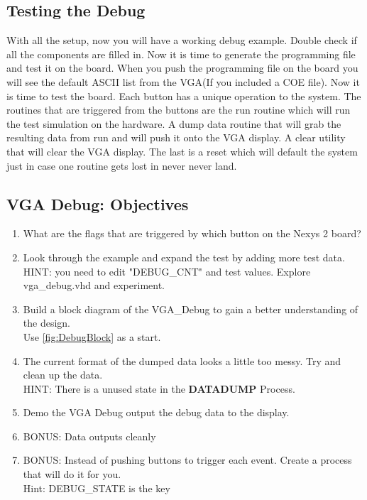 \documentclass{article}
\begin{document}
\newpage

\subsection{Testing the Debug}
With all the setup, now you will have a working debug example. Double check if all the components are filled in. Now it is time to generate the programming file and test it on the board. When you push the programming file on the board you will see the default ASCII list from the VGA(If you included a COE file). Now it is time to test the board. Each button has a unique operation to the system. The routines that are triggered from the buttons are the run routine which will run the test simulation on the hardware. A dump data routine that will grab the resulting data from run and will push it onto the VGA display. A clear utility that will clear the VGA display. The last is a reset which will default the system just in case one routine gets lost in never never land.

\subsection{VGA Debug: Objectives}
\begin{enumerate}
  \item What are the flags that are triggered by which button on the Nexys 2 board?
  \item Look through the example and expand the test by adding more test data.\\
  HINT: you need to edit "DEBUG\_CNT" and test values. Explore vga\_debug.vhd and experiment.
  \item Build a block diagram of the VGA\_Debug to gain a better understanding of the design.\\
  Use \ref{fig:DebugBlock} as a start.
  \item The current format of the dumped data looks a little too messy. Try and clean up the data.\\
  HINT: There is a unused state in the \textbf{DATADUMP} Process.
  \item Demo the VGA Debug output the debug data to the display.
  \item BONUS: Data outputs cleanly
  \item BONUS: Instead of pushing buttons to trigger each event. Create a process that will do it for you. \\
  Hint: DEBUG\_STATE is the key
\end{enumerate}
\end{document}
